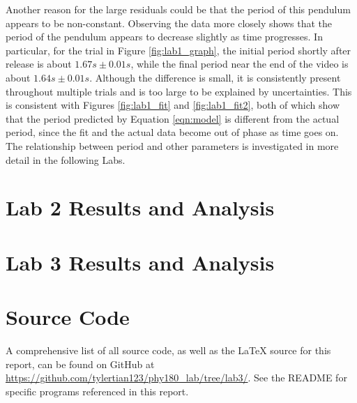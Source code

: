 \documentclass[aps,twocolumn,secnumarabic,nobalancelastpage,amsmath,amssymb,nofootinbib,floatfix,letterpaper]{revtex4}
\begin{document}
Another reason for the large residuals could be that the period of this pendulum appears to be non-constant.
Observing the data more closely shows that the period of the pendulum appears to decrease slightly as time progresses.
In particular, for the trial in Figure \ref{fig:lab1_graph}, the initial period shortly after release is about
\(1.67\si{s} \pm 0.01\si{s}\), while the final period near the end of the video is about \(1.64\si{s} \pm 0.01\si{s}\).
Although the difference is small, it is consistently present throughout multiple trials and is too large to be explained
by uncertainties. This is consistent with Figures \ref{fig:lab1_fit} and \ref{fig:lab1_fit2}, both of which show that
the period predicted by Equation \ref{eqn:model} is different from the actual period, since the fit and the actual data
become out of phase as time goes on. The relationship between period and other parameters is investigated in more
detail in the following Labs.


\section{Lab 2 Results and Analysis}


\section{Lab 3 Results and Analysis}


\appendix

\section{Source Code}

A comprehensive list of all source code, as well as the \LaTeX{} source for this report, can be found on GitHub at
\url{https://github.com/tylertian123/phy180_lab/tree/lab3/}. See the README for specific programs referenced in this
report.
\label{appendix:code}
\end{document}
